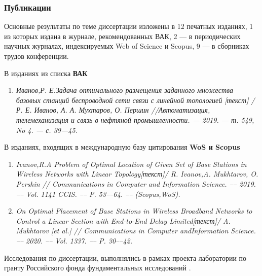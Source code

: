 \begin{frame}
    \frametitle{Публикации}
    \fontsize{8pt}{7.2}\selectfont

    Основные результаты по теме диссертации изложены в 12 печатных изданиях, 1 из которых издана в журнале, рекомендованных ВАК, 2 — в периодических научных журналах, индексируемых Web of Science и Scopus, 9 — в сборниках трудов конференции. 
    
    \bigskip
    
    В изданиях из списка \textbf{ВАК} 
    \begin{enumerate}
        \item \textit{Иванов,Р. Е.Задача оптимального размещения заданного множе­ства базовых станций беспроводной сети связи с линейной топо­логией [текст] / Р. Е. Иванов, А. А. Мухтаров, О. Першин //Автоматизация, телемеханизация и связь в нефтяной промышлен­ности. — 2019. — т. 549, No 4. — с. 39—45.}
    \end{enumerate}

    \bigskip

    В изданиях, входящих в международную базу цитирования \textbf{WoS и Scopus}

    \begin{enumerate}
        \item \textit{Ivanov,R.A Problem of Optimal Location of Given Set of Base Sta­tions in Wireless Networks with Linear Topology[текст]/ R. Ivanov,A. Mukhtarov, O. Pershin // Communications in Computer and Infor­mation Science. –– 2019. –– Vol. 1141 CCIS. –– P. 53––64. –– (Scopus,WoS).}
        \item  \textit{On Optimal Placement of Base Stations in Wireless Broadband Net­works to Control a Linear Section with End-to-End Delay Limited[текст]/ A. Mukhtarov [et al.] // Communications in Computer andInformation Science. –– 2020. –– Vol. 1337. –– P. 30––42.}
    \end{enumerate}

    \bigskip

    Исследования по диссертации, выполнялись в рамках проекта лаборатории по гранту Российского фонда фундаментальных исследований .
\end{frame}

